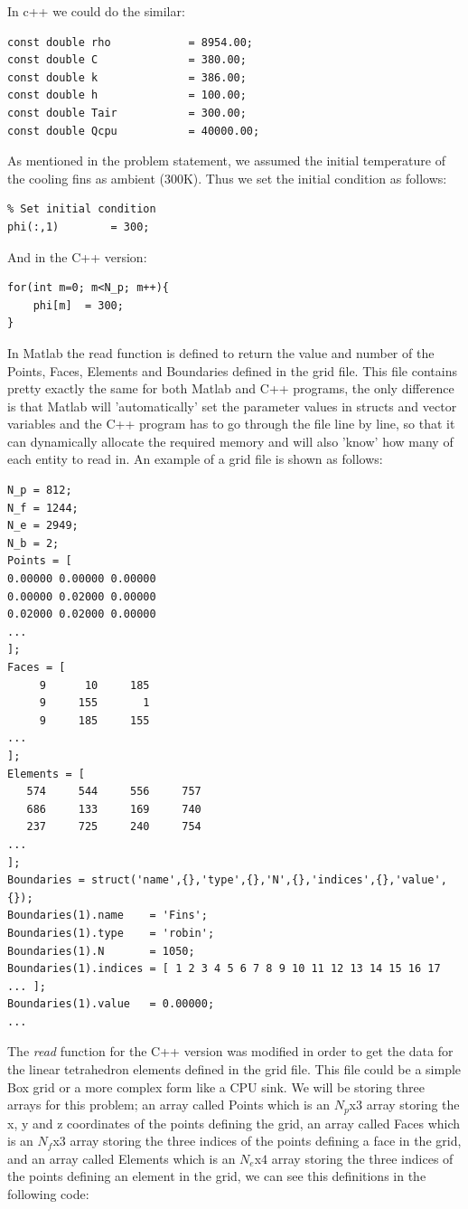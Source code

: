 \documentclass[12pt]{article}
\begin{document}
In c++ we could do the similar:

\begin{lstlisting}[style=MyC++Style]
const double rho            = 8954.00;
const double C              = 380.00;
const double k              = 386.00;
const double h              = 100.00;
const double Tair           = 300.00;
const double Qcpu           = 40000.00;
\end{lstlisting}

As mentioned in the problem statement, we assumed the initial temperature of the cooling fins as ambient (300K). Thus we set the initial condition as follows:

\begin{lstlisting}
% Set initial condition
phi(:,1)        = 300;
\end{lstlisting}

And in the C++ version:

\begin{lstlisting}[style=MyC++Style]
for(int m=0; m<N_p; m++){
	phi[m]	= 300;
}
\end{lstlisting}

In Matlab the read function is defined to return the value and number of the Points, Faces, Elements and Boundaries defined in the grid file. This file contains pretty exactly the same for both Matlab and C++ programs, the only difference is that Matlab will 'automatically' set the parameter values in structs and vector variables and the C++ program has to go through the file line by line, so that it can dynamically allocate the required memory and will also 'know' how many of each entity to read in. An example of a grid file is shown as follows:

\begin{lstlisting}
N_p = 812;
N_f = 1244;
N_e = 2949;
N_b = 2;
Points = [
0.00000	0.00000	0.00000
0.00000	0.02000	0.00000
0.02000	0.02000	0.00000
...
];
Faces = [
     9	    10	   185
     9	   155	     1
     9	   185	   155
...
];
Elements = [
   574	   544	   556	   757
   686	   133	   169	   740
   237	   725	   240	   754
...
];
Boundaries = struct('name',{},'type',{},'N',{},'indices',{},'value',{});
Boundaries(1).name    = 'Fins';
Boundaries(1).type    = 'robin';
Boundaries(1).N       = 1050;
Boundaries(1).indices = [ 1 2 3 4 5 6 7 8 9 10 11 12 13 14 15 16 17 ... ];
Boundaries(1).value   = 0.00000;
...
\end{lstlisting}

The \textit{read} function for the C++ version was modified in order to get the data for the linear tetrahedron elements defined in the grid file. This file could be a simple Box grid or a more complex form like a CPU sink. We will be storing three arrays for this problem; an array called Points which is an $N_p$x$3$ array storing the x, y and z coordinates of the points defining the grid, an array called Faces which is an $N_f$x$3$ array storing the three indices of the points defining a face in the grid, and an array called Elements which is an $N_e$x$4$ array storing the three indices of the points defining an element in the grid, we can see this definitions in the following code:
\end{document}
